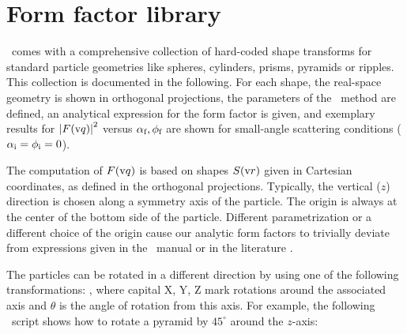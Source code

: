 
\chapter{Form factor library}  \label{SFF}

\makeatletter
\renewcommand{\@thesubfigure}{\relax}
\makeatother


\def\ffsection#1{\FloatBarrier\clearpage\ifodd\value{page}
\textit{Page intentionally left blank}\clearpage\else\fi
\section{#1}}


\BornAgain\ comes with a comprehensive collection of hard-coded
shape transforms for standard particle geometries like
spheres, cylinders, prisms, pyramids or ripples.
This collection is documented in the following.
For each shape,
the real-space geometry is shown in orthogonal projections,
the parameters of the \BornAgain\ method are defined,
an analytical expression for the form factor is given,
and exemplary results for $\left|F(\text{v}{q})\right|^2$ versus
$\alpha_{\text{f}},\phi_{\text{f}}$ are shown for small-angle scattering conditions
($\alpha_{\text{i}}=\phi_{\text{i}}=0$).

The computation of $F(\text{v}{q})$ is based on
shapes $S(\text{v}{r})$ given in Cartesian coordinates,
as defined in the orthogonal projections.
Typically, the vertical ($z$) direction is chosen
along a symmetry axis of the particle.
The origin is always at the center of the bottom side of the particle.
Different parametrization or a different choice of the origin
cause our analytic form factors to trivially deviate
from expressions given in the \IsGISAXS\ manual \cite[Sec.~2.3]{Laz08}
or in the literature \cite[Appendix]{ReLL09}.

The particles can be rotated in a different direction by using one of
the following transformations: , where capital X, Y, Z mark rotations
around the associated axis and $\theta$ is the
angle of rotation from this axis. For example, the following \ script shows how to rotate a pyramid by $45^{\circ}$ around
the $z$-axis:\\

